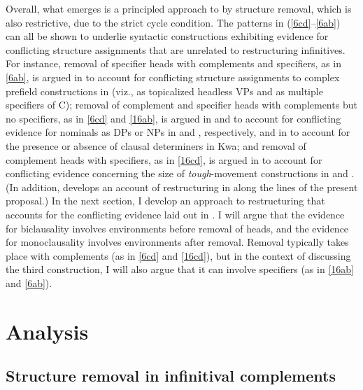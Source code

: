 \documentclass[output=paper]{langsci/langscibook}
\begin{document}
\noindent Overall, what emerges is a principled approach to  by
structure removal, which is also restrictive, due to the strict cycle
condition. The patterns in (\ref{6cd}--\ref{6ab}) can all be shown to
underlie syntactic constructions exhibiting evidence for conflicting structure
assignments that are unrelated to restructuring infinitives. For instance,
removal of specifier heads with complements and specifiers, as in \eqref{6ab}, is
argued in \citet{Mueller:17:pre} to account for conflicting structure
assignments to  complex prefield constructions in  (viz., as topicalized
headless VPs  and as multiple specifiers of C); removal of complement and
specifier heads with complements but no specifiers, as in \eqref{6cd} and
\eqref{16ab}, is argued in \citet{Mueller:15:str} and \citet{Puskar:16} to account
for conflicting evidence for nominals as DPs or NPs in  and
, respectively, and in \citet{Korsah&Murphy:17:aga} to account for
the presence or absence of clausal determiners in Kwa; and removal of
complement heads with specifiers, as in \eqref{16cd}, is argued in
\citet{Schwarzer:16} to account for conflicting evidence concerning the size of
{\itshape tough}-movement constructions in  and . (In addition,
\citealt{Dschaak:17} develops an account of restructuring in  along the
lines of the present proposal.) In the next section, I develop an approach to
restructuring that accounts for the conflicting evidence laid out in .
I will argue that the evidence for biclausality involves environments before
removal of  heads, and the evidence for monoclausality involves environments
after removal. Removal typically takes place with complements (as in
\ref{6cd} and \ref{16cd}), but in the context of discussing the third
construction, I will also argue that it can involve specifiers (as in
\ref{16ab} and \ref{6ab}).

\section{Analysis}\label{sec:32.4}\largerpage

\subsection{Structure removal in infinitival complements}
\end{document}
